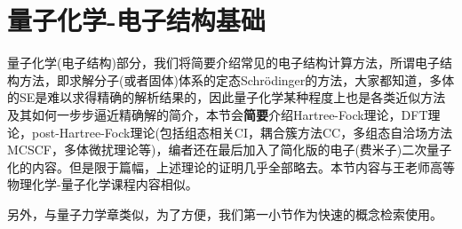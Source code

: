 \documentclass{article}
\numberwithin{equation}{section}
\begin{document}
  \section{量子化学-电子结构基础}
    量子化学(电子结构)部分，我们将简要介绍常见的电子结构计算方法，所谓电子结构方法，即求解分子(或者固体)体系的定态Schr\"odinger的方法，大家都知道，多体的SE是难以求得精确的解析结果的，因此量子化学某种程度上也是各类近似方法及其如何一步步逼近精确解的简介，本节会{\color{red}\textbf{简要}}介绍Hartree-Fock理论，DFT理论，post-Hartree-Fock理论(包括组态相关CI，耦合簇方法CC，多组态自洽场方法MCSCF，多体微扰理论等)，编者还在最后加入了简化版的电子(费米子)二次量子化的内容。但是限于篇幅，上述理论的证明几乎全部略去。本节内容与王老师高等物理化学-量子化学课程内容相似。
    
    另外，与量子力学章类似，为了方便，我们第一小节作为快速的概念检索使用。
\end{document}

